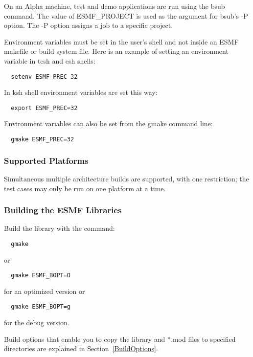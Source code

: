 On an Alpha machine, test and demo applications are run using 
the bsub command.  The value of ESMF\_PROJECT is used as the 
argument for bsub's -P option. The -P option assigns a job to 
a specific project.  

Environment variables must be set in the user's shell and not
inside an ESMF makefile or build system file.  Here is an example 
of setting an environment variable in tcsh and csh shells:

\begin{verbatim}
  setenv ESMF_PREC 32
\end{verbatim}

In ksh shell environment variables are set this way:

\begin{verbatim}
  export ESMF_PREC=32
\end{verbatim}

Environment variables can also be set from the gmake command line:

\begin{verbatim}
  gmake ESMF_PREC=32
\end{verbatim}

\subsubsection{Supported Platforms}


Simultaneous multiple architecture builds are supported, with
one restriction; the test cases may only be run on one platform at a time. 

\subsubsection{Building the ESMF Libraries}
\label{BuildESMF}



Build the library with the command:
\begin{verbatim}
  gmake 
\end{verbatim}
or 
\begin{verbatim}
  gmake ESMF_BOPT=O
\end{verbatim}
  for an optimized version or
\begin{verbatim}
  gmake ESMF_BOPT=g  
\end{verbatim}
  for the debug version.

Build options that enable you to copy the library and *.mod files to
specified directories are explained in Section~\ref{BuildOptions}. 

